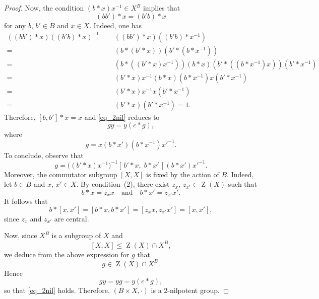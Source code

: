 \documentclass[10pt,a4paper]{amsart}
\DeclareMathOperator{\bZ}{Z}
\begin{document}
\begin{proof}
    Now, the condition \((b \ast x)x^{-1}\in X^B\) implies that
    \[
        (bb')\ast x=(b'b)\ast x
    \]
    for any \(b\), \(b'\in B\) and \(x\in X\). Indeed, one has
    \begin{align*}
        ((bb') \ast x)((b'b) \ast x)^{-1} = & ((bb') \ast x)((b'b) \ast x^{-1})                                                      \\
        =                                   & (b \ast (b' \ast x)) (b' \ast (b \ast x^{-1}))                                         \\
        =                                   & (b \ast ((b' \ast x) x^{-1})) (b \ast x) (b' \ast ((b \ast x^{-1})x))(b' \ast x^{-1} ) \\
        =                                   & (b' \ast x)x^{-1} (b \ast x) (b \ast x^{-1})x (b' \ast x^{-1} )                        \\
        =                                   & (b' \ast x)x^{-1} x (b' \ast x^{-1} )                                                  \\
        =                                   & (b' \ast x)(b' \ast x^{-1})=1.
    \end{align*}
    Therefore, \([b,b'] \ast x=x\) and \eqref{eq_2nil} reduces to
    \[
        gy = y(c\ast g),
    \]
    where
    \[
        g=x(b\ast x')(b\ast x^{-1})x'^{-1}.
    \]
    To conclude, observe that
    \[
        g=\bigl((b'\ast x)x^{-1}\bigr)^{-1}[\,b'\ast x,\; b\ast x'\,](b\ast x')x'^{-1}.
    \]
    Moreover, the commutator subgroup \([X,X]\) is fixed by the action of \(B\). Indeed, let \(b\in B\) and \(x\), \(x'\in X\). By condition~(2), there exist \(z_x\), \(z_{x'}\in \bZ(X)\) such that
    \[
        b\ast x = z_x x
        \quad\text{and}\quad
        b\ast x' = z_{x'}x'.
    \]
    It follows that
    \[
        b\ast [x,x']=[b\ast x,b\ast x']=[z_xx,z_{x'}x']=[x,x'],
    \]
    since \(z_x\) and \(z_{x'}\) are central.

    Now, since \(X^B\) is a subgroup of \(X\) and
    \[
        [X,X]\leq \bZ(X)\cap X^B,
    \]
    we deduce from the above expression for \(g\) that
    \[
        g\in \bZ(X)\cap X^B.
    \]
    Hence
    \[
        gy = yg = y(c\ast g),
    \]
    so that \eqref{eq_2nil} holds. Therefore, \((B \times X,\cdot)\) is a \(2\)-nilpotent group.
\end{proof}
\end{document}
